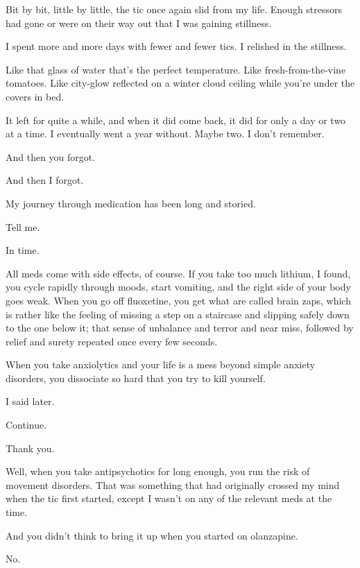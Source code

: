 \begin{paracol}{2}
\begin{leftcolumn}
\noindent Bit by bit, little by little, the tic once again slid from my life. Enough stressors had gone or were on their way out that I was gaining stillness.

I spent more and more days with fewer and fewer tics. I relished in the stillness.

\begin{ally}
Like that glass of water that's the perfect temperature. Like fresh-from-the-vine tomatoes. Like city-glow reflected on a winter cloud ceiling while you're under the covers in bed.
\end{ally}
It left for quite a while, and when it did come back, it did for only a day or two at a time. I eventually went a year without. Maybe two. I don't remember.

\begin{ally}
And then you forgot.
\end{ally}
And then I forgot.
\newpage

\noindent My journey through medication has been long and storied.

\begin{ally}
Tell me.
\end{ally}
In time.

All meds come with side effects, of course. If you take too much lithium, I found, you cycle rapidly through moods, start vomiting, and the right side of your body goes weak. When you go off fluoxetine, you get what are called brain zaps, which is rather like the feeling of missing a step on a staircase and slipping safely down to the one below it; that sense of unbalance and terror and near miss, followed by relief and surety repeated once every few seconds.

\begin{ally}
When you take anxiolytics and your life is a mess beyond simple anxiety disorders, you dissociate so hard that you try to kill yourself.
\end{ally}
I said later.

\begin{ally}
Continue.
\end{ally}
Thank you.

Well, when you take antipsychotics for long enough, you run the risk of movement disorders. That was something that had originally crossed my mind when the tic first started, except I wasn't on any of the relevant meds at the time.

\begin{ally}
And you didn't think to bring it up when you started on olanzapine.
\end{ally}
No.


\end{leftcolumn}
\end{paracol}
